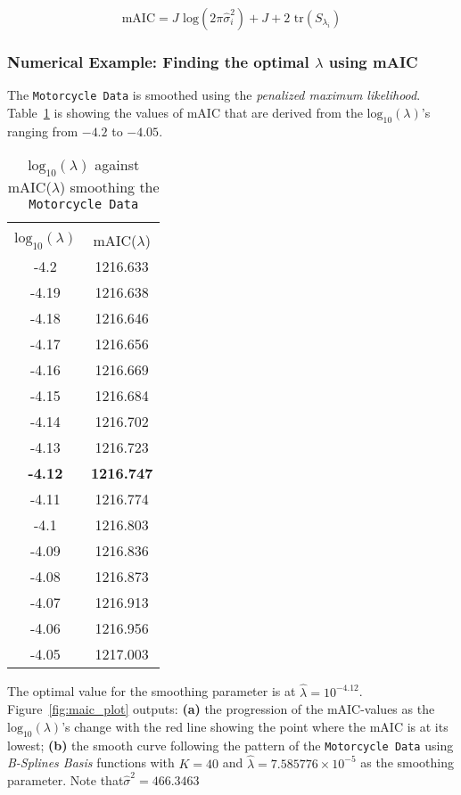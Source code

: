 \begin{equation}
\text{mAIC} = J \text{ log}(2 \pi \hat{\sigma}_i^2) + J + 2\text{ tr}(S_{\lambda_i})
\end{equation}

\subsubsection*{Numerical Example: Finding the optimal $\lambda$ using mAIC}
The \texttt{Motorcycle Data} is smoothed using the \textit{penalized maximum likelihood}. Table~\ref{table:maic_penml} is showing the values of mAIC that are derived from the $\text{log}_{10} (\lambda)$'s ranging from $-4.2$ to $-4.05$. 
\begin{table}[ht]
\caption[Minimizing the mAIC yields to the optimal $\hat{\lambda}$ using \textit{Penalized Maximum Likelihood} method]{$\text{log}_{10} (\lambda)$ against mAIC($\lambda$) smoothing the \texttt{Motorcycle Data}} 
\centering %
\begin{tabular}{c c } %
\hline\hline %
&\\[-2ex]
$\text{log}_{10} (\lambda)$ & mAIC($\lambda$) \\ [0.5ex] %
\hline\hline 
-4.2	&	1216.633	\\
-4.19	&	1216.638	\\
-4.18	&	1216.646	\\
-4.17	&	1216.656	\\
-4.16	&	1216.669	\\
-4.15	&	1216.684	\\
-4.14	&	1216.702	\\
-4.13	&	1216.723	\\
\textbf{-4.12}	&	\textbf{1216.747}	\\
-4.11	&	1216.774	\\
-4.1	&	1216.803	\\
-4.09	&	1216.836	\\
-4.08	&	1216.873	\\
-4.07	&	1216.913	\\
-4.06	&	1216.956	\\
-4.05	&	1217.003	\\
 [0.25ex] %
\hline %
\end{tabular}
\label{table:maic_penml} %
\end{table}
The optimal value for the smoothing parameter is at $\hat{\lambda} = 10^{-4.12}$. Figure~\ref{fig:maic_plot} outputs: \textbf{(a)} the progression of the mAIC-values as the $\text{log}_{10} (\lambda)$'s change with the red line showing the point where the mAIC is at its lowest; \textbf{(b)} the smooth curve following the pattern of the \texttt{Motorcycle Data} using \textit{B-Splines Basis} functions with $K = 40$ and $\hat{\lambda} = 7.585776 \times 10^{-5}$ as the smoothing parameter. Note that$\hat{\sigma}^2 = 466.3463$

